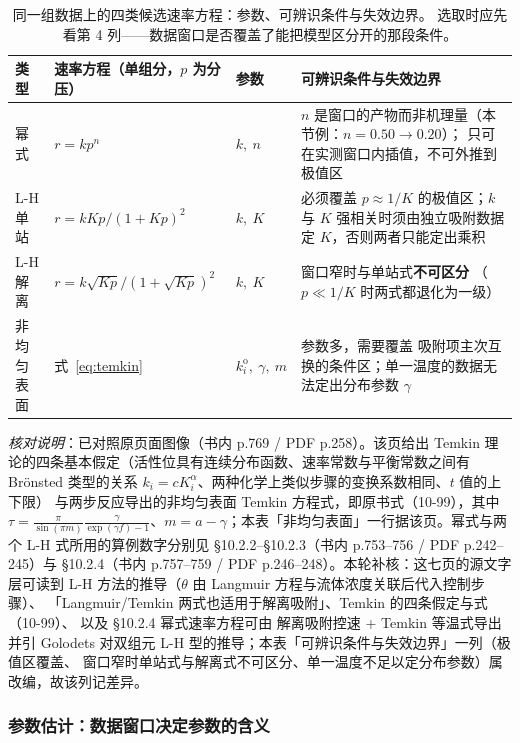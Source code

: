 \begin{table}[htbp]
\centering
\caption{同一组数据上的四类候选速率方程：参数、可辨识条件与失效边界。
选取时应先看第 4 列——数据窗口是否覆盖了能把模型区分开的那段条件。
}
\label{tab:ch10-modelfam}
\begin{tabularx}{\textwidth}{@{}l l l X@{}}
\toprule
类型 & 速率方程（单组分，$p$ 为分压） & 参数 & 可辨识条件与失效边界 \\
\midrule
幂式 & $r=kp^{n}$ & $k,\ n$ & $n$ 是窗口的产物而非机理量（本节例：$n=0.50\to0.20$）；
只可在实测窗口内插值，不可外推到极值区 \\
L-H 单站 & $r=kKp/(1+Kp)^{2}$ & $k,\ K$ & 必须覆盖 $p\approx1/K$ 的极值区；$k$ 与 $K$
强相关时须由独立吸附数据定 $K$，否则两者只能定出乘积 \\
L-H 解离 & $r=k\sqrt{Kp}/(1+\sqrt{Kp})^{2}$ & $k,\ K$ & 窗口窄时与单站式\textbf{不可区分}
（$p\ll1/K$ 时两式都退化为一级） \\
非均匀表面 & 式~\eqref{eq:temkin} & $k_i^{\mathrm{o}},\ \gamma,\ m$ & 参数多，需要覆盖
吸附项主次互换的条件区；单一温度的数据无法定出分布参数 $\gamma$ \\
\bottomrule
\end{tabularx}
\end{table}
\emph{核对说明}：已对照原页面图像（书内 p.769 / PDF p.258）。该页给出 Temkin
理论的四条基本假定（活性位具有连续分布函数、速率常数与平衡常数之间有 Br\"onsted 类型的关系
$k_i=cK_i^{\alpha}$、两种化学上类似步骤的变换系数相同、$t$ 值的上下限）
与两步反应导出的非均匀表面 Temkin 方程式，即原书式（10-99），其中
$\tau=\frac{\pi}{\sin(\pi m)}\frac{\gamma}{\exp(\gamma
f)-1}$、$m=a-\gamma$；本表「非均匀表面」一行据该页。幂式与两个 L-H 式所用的算例数字分别见
§10.2.2--§10.2.3（书内 p.753--756 / PDF p.242--245）与
§10.2.4（书内 p.757--759 / PDF p.246--248）。本轮补核：这七页的源文字层可读到
L-H 方法的推导（$\theta$ 由 Langmuir 方程与流体浓度关联后代入控制步骤）、
「Langmuir/Temkin 两式也适用于解离吸附」、Temkin 的四条假定与式（10-99）、
以及 §10.2.4 幂式速率方程可由  解离吸附控速 + Temkin 等温式导出并引
Golodets 对双组元 L-H 型的推导；本表「可辨识条件与失效边界」一列（极值区覆盖、
窗口窄时单站式与解离式不可区分、单一温度不足以定分布参数）属改编，故该列记差异。

\subsubsection{参数估计：数据窗口决定参数的含义}


